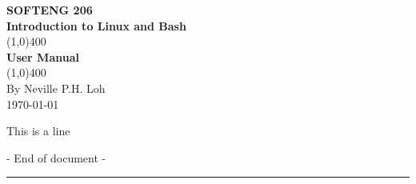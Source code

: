 \documentclass[11pt]{book}
\begin{document}
\begin{titlepage}
\begin{center}
\vspace*{2cm}
\Large{\textbf {SOFTENG 206}}\\
\Large{\textbf {Introduction to Linux and Bash}}\\[1cm]
\line(1,0){400}\\[5mm]
\Large{\textbf{User Manual}}\\[1mm]
\line(1,0){400}\\[1cm]
By Neville P.H. Loh \\
\today\\
\vfill

\end{center}
\end{titlepage}
\tableofcontents
\break

This is a line
\setcounter{page}{1}


\vfill
\begin{center}
- End of document -
\rule{17cm}{0.4pt}
\end{center}
\end{document}
